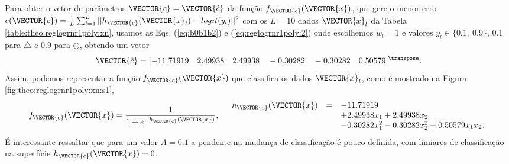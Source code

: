 \begin{SolutionT}\label{sol:theo:reglogrnr1poly:s1}
Para obter o vetor de parâmetros $\VECTOR{c}=\VECTOR{\hat{c}}$ da função $f_{\VECTOR{c}}(\VECTOR{x})$, 
que gere o menor erro $e(\VECTOR{c}) = \frac{1}{L} \sum_{l=1}^{L} ||h_{\VECTOR{c}}(\VECTOR{x}_l)-logit(y_l)||^2$
com os $L=10$ dados $\VECTOR{x}_l$ da Tabela \ref{table:theo:reglogrnr1poly:xn},
usamos as Eqs. (\ref{eq:b0b1b2}) e  (\ref{eq:reglogrnr1poly:2}) onde escolhemos $w_l=1$ e valores $y_l \in \{0.1,~ 0.9\}$,
$0.1$ para $\bigtriangleup$ e $0.9$ para $\bigcirc$, 
obtendo um vetor 
\begin{equation}
\VECTOR{\hat{c}}=[-11.71919\quad 2.49938\quad 2.49938\quad -0.30282\quad -0.30282\quad 0.50579]^{\transpose}.
\end{equation}
Assim, podemos representar a função $f_{\VECTOR{c}}(\VECTOR{x})$ que classifica os dados $\VECTOR{x}_l$, 
como é mostrado na Figura \ref{fig:theo:reglogrnr1poly:xn:s1},
\begin{equation}
f_{\VECTOR{c}}(\VECTOR{x})= \frac{1}{1+e^{-h_{\VECTOR{c}}(\VECTOR{x})}},
\quad
\begin{array}{lll}
h_{\VECTOR{c}}(\VECTOR{x}) & = & -11.71919\\
                         ~ & ~ & +2.49938 x_1 +2.49938 x_2 \\
                         ~ & ~ & -0.30282 x_1^2 -0.30282  x_2^2 + 0.50579 x_1 x_2.\\
\end{array}
\end{equation}
É interessante ressaltar que para um valor $A=0.1$ a pendente na mudança de classificação é pouco definida,
com limiares de classificação na superfície $h_{\VECTOR{c}}(\VECTOR{x})=0$.
\end{SolutionT}

